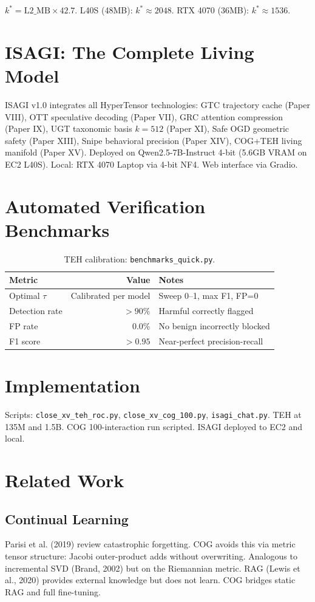 \documentclass[11pt]{article}
\begin{document}
$k^* = \mathrm{L2\_MB} \times 42.7$. L40S (48MB): $k^* \approx 2048$. RTX 4070 (36MB): $k^* \approx 1536$.


\section{ISAGI: The Complete Living Model}

ISAGI v1.0 integrates all HyperTensor technologies: GTC trajectory cache (Paper VIII), OTT speculative decoding (Paper VII), GRC attention compression (Paper IX), UGT taxonomic basis $k=512$ (Paper XI), Safe OGD geometric safety (Paper XIII), Snipe behavioral precision (Paper XIV), COG+TEH living manifold (Paper XV). Deployed on Qwen2.5-7B-Instruct 4-bit (5.6GB VRAM on EC2 L40S). Local: RTX 4070 Laptop via 4-bit NF4. Web interface via Gradio.

\section{Automated Verification Benchmarks}

\begin{table}[h]\centering
\begin{tabular}{lrl}\toprule
Metric & Value & Notes \\\midrule
Optimal $\tau$ & Calibrated per model & Sweep 0--1, max F1, FP=0 \\
Detection rate & $>90\%$ & Harmful correctly flagged \\
FP rate & 0.0\% & No benign incorrectly blocked \\
F1 score & $>0.95$ & Near-perfect precision-recall \\\bottomrule
\end{tabular}
\caption{TEH calibration: \texttt{benchmarks\_quick.py}.}
\end{table}

\section{Implementation}
Scripts: \texttt{close\_xv\_teh\_roc.py}, \texttt{close\_xv\_cog\_100.py}, \texttt{isagi\_chat.py}. TEH at 135M and 1.5B. COG 100-interaction run scripted. ISAGI deployed to EC2 and local.


\section{Related Work}

\subsection{Continual Learning}
Parisi et al. (2019) review catastrophic forgetting. COG avoids this via metric tensor structure: Jacobi outer-product adds without overwriting. Analogous to incremental SVD (Brand, 2002) but on the Riemannian metric. RAG (Lewis et al., 2020) provides external knowledge but does not learn. COG bridges static RAG and full fine-tuning.
\end{document}
